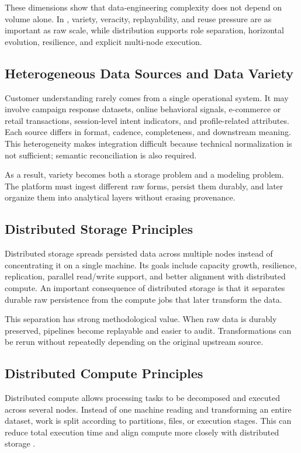 These dimensions show that data-engineering complexity does not depend on volume alone. In \projectname{}, variety, veracity, replayability, and reuse pressure are as important as raw scale, while distribution supports role separation, horizontal evolution, resilience, and explicit multi-node execution.

\subsection{Heterogeneous Data Sources and Data Variety}
Customer understanding rarely comes from a single operational system. It may involve campaign response datasets, online behavioral signals, e-commerce or retail transactions, session-level intent indicators, and profile-related attributes. Each source differs in format, cadence, completeness, and downstream meaning. This heterogeneity makes integration difficult because technical normalization is not sufficient; semantic reconciliation is also required.

As a result, variety becomes both a storage problem and a modeling problem. The platform must ingest different raw forms, persist them durably, and later organize them into analytical layers without erasing provenance.

\subsection{Distributed Storage Principles}
Distributed storage spreads persisted data across multiple nodes instead of concentrating it on a single machine. Its goals include capacity growth, resilience, replication, parallel read/write support, and better alignment with distributed compute. An important consequence of distributed storage is that it separates durable raw persistence from the compute jobs that later transform the data.

This separation has strong methodological value. When raw data is durably preserved, pipelines become replayable and easier to audit. Transformations can be rerun without repeatedly depending on the original upstream source.

\subsection{Distributed Compute Principles}
Distributed compute allows processing tasks to be decomposed and executed across several nodes. Instead of one machine reading and transforming an entire dataset, work is split according to partitions, files, or execution stages. This can reduce total execution time and align compute more closely with distributed storage \cite{kleppmann2017ddia}.

